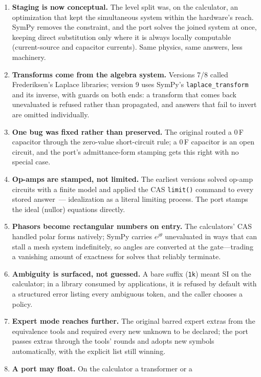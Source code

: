 \documentclass[11pt,oneside]{report}
\newcommand{\code}[1]{\texttt{#1}}
\begin{document}
\begin{enumerate}
\item \textbf{Staging is now conceptual.} The level split was, on the
  calculator, an optimization that kept the simultaneous system within
  the hardware's reach. SymPy removes the constraint, and the port
  solves the joined system at once, keeping direct substitution only
  where it is always locally computable (current-source and capacitor
  currents). Same physics, same answers, less machinery.
\item \textbf{Transforms come from the algebra system.} Versions 7/8
  called Frederiksen's Laplace libraries; version 9 uses SymPy's
  \code{laplace\_transform} and its inverse, with guards on both ends:
  a transform that comes back unevaluated is refused rather than
  propagated, and answers that fail to invert are omitted
  individually.
\item \textbf{One bug was fixed rather than preserved.} The original
  routed a 0\,F capacitor through the zero-value short-circuit rule; a
  0\,F capacitor is an open circuit, and the port's admittance-form
  stamping gets this right with no special case.
\item \textbf{Op-amps are stamped, not limited.} The earliest versions
  solved op-amp circuits with a finite model and applied the CAS
  \code{limit()} command to every stored answer~\cite{paper1999}---%
  idealization as a literal limiting process. The port stamps the
  ideal (nullor) equations directly.
\item \textbf{Phasors become rectangular numbers on entry.} The
  calculators' CAS handled polar forms natively; SymPy carries
  $e^{j\theta}$ unevaluated in ways that can stall a mesh system
  indefinitely, so angles are converted at the gate---trading a
  vanishing amount of exactness for solves that reliably terminate.
\item \textbf{Ambiguity is surfaced, not guessed.} A bare suffix
  (\code{1k}) meant SI on the calculator; in a library consumed by
  applications, it is refused by default with a structured error
  listing every ambiguous token, and the caller chooses a policy.
\item \textbf{Expert mode reaches further.} The original barred expert
  extras from the equivalence tools and required every new unknown to
  be declared; the port passes extras through the tools' rounds and
  adopts new symbols automatically, with the explicit list still
  winning.
\item \textbf{A port may float.} On the calculator a transformer or a

\end{enumerate}
\end{document}
